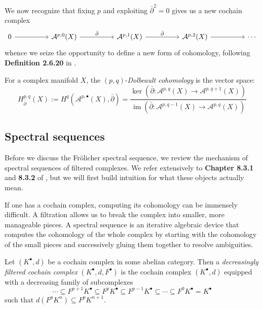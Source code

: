 \documentclass[11pt]{article}
\newcommand{\image}{\operatorname{im}}
\theoremstyle{definition}
\numberwithin{theorem}{section} %
\numberwithin{equation}{section} %
\begin{document}
\noindent We now recognize that fixing $p$ and exploiting $\bar\partial^2=0$ gives us a new cochain complex
\[\begin{tikzcd}
	0 && {\mathcal{A}^{p,0}(X)} && {\mathcal{A}^{p,1}(X)} && {\mathcal{A}^{p,2}(X)} && \cdots
	\arrow[from=1-1, to=1-3]
	\arrow["{\bar\partial}", from=1-3, to=1-5]
	\arrow["{\bar\partial}", from=1-5, to=1-7]
	\arrow[from=1-7, to=1-9]
\end{tikzcd}\]
whence we seize the opportunity to define a new form of cohomology, following \textbf{Definition 2.6.20} in \cite{Huybrechts2005}.

\begin{definition}
    For a complex manifold $X$, the $(p,q)$-\emph{Dolbeault cohomology} is the vector space:
    $$
    H^{p,q}_{\bar\partial}(X) := H^q\left(\mathcal{A}^{p,\bullet}(X), \bar\partial\right) = \frac{\ker \left(\bar\partial:\mathcal{A}^{p,q}(X) \to \mathcal{A}^{p,q+1}(X)\right)}{\image \left(\bar\partial:\mathcal{A}^{p,q-1}(X) \to \mathcal{A}^{p,q}(X)\right)}
    $$
\end{definition}


\subsection{Spectral sequences}
Before we discuss the Fr\"olicher spectral sequence, we review the mechanism of spectral sequences of filtered complexes. We refer extensively to \textbf{Chapter 8.3.1} and \textbf{8.3.2} of \cite{VoisinI2002}, but we will first build intuition for what these objects actually mean.

\medskip

\noindent If one has a cochain complex, computing its cohomology can be immensely difficult. A filtration allows us to break the complex into smaller, more manageable pieces. A spectral sequence is an iterative algebraic device that computes the cohomology of the whole complex by starting with the cohomology of the small pieces and successively gluing them together to resolve ambiguities.
\begin{definition}
    Let $\left(K^\bullet,d\right)$ be a cochain complex in some abelian category. Then a \emph{decreasingly filtered cochain complex} $\left(K^\bullet, d, F^\bullet\right)$ is the cochain complex $\left(K^\bullet, d\right)$ equipped with a decreasing family of subcomplexes
    $$
    \cdots \subseteq F^{p+1} K^\bullet \subseteq F^p K^\bullet \subseteq F^{p-1} K^\bullet \subseteq \cdots \subseteq F^0K^\bullet  = K^\bullet
    $$
    such that $d\left(F^pK^n\right)\subseteq F^pK^{n+1}$. 
\end{definition}
\end{document}
